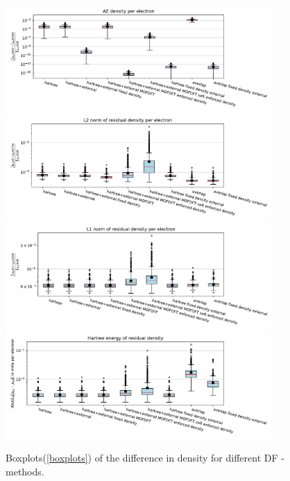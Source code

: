 \begin{figure}
    \includegraphics[width=0.9\textwidth]{chapters/results/results_images/AE_density_on_even_tempered_2.5_for_different_df_methods}
    \includegraphics[width=0.9\textwidth]{chapters/results/results_images/L2_residual_densities_on_even_tempered_2.5_for_different_df_methods}
    \includegraphics[width=0.9\textwidth]{chapters/results/results_images/L1_residual_densities_on_even_tempered_2.5_for_different_df_methods}
    \includegraphics[width=0.9\textwidth]{chapters/results/results_images/L2_residual_hartree_on_even_tempered_2.5_for_different_df_methods}
    \caption{Boxplots(\ref{boxplots}) of the difference in density for different DF - methods.}
    \label{fig:Densities_df_methods}
\end{figure}
